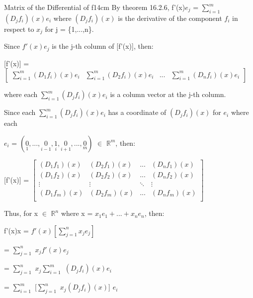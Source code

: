     \begin{definition}{Matrix of the Differential of f}{14cm}
        By {\color{red} theorem 16.2.6},
        f'(x)$e_j$ = $\sum_{i=1}^m$ $(D_jf_i)(x)e_i$
        where $(D_jf_i)(x)$ is the derivative of the
        component $f_i$ in respect to $x_j$ for j = \{1,...,n\}.

        Since $f'(x)e_j$ is the j-th column of [f'(x)], then:

        \vspace{0.1cm}

        \hspace{0.5cm}
        [f'(x)] = 
        $
        \begin{bmatrix}
            \sum_{i=1}^m (D_1f_i)(x)e_i
            & \sum_{i=1}^m (D_2f_i)(x)e_i
            & ...
            & \sum_{i=1}^m (D_nf_i)(x)e_i
        \end{bmatrix}
        $

        where each $\sum_{i=1}^m (D_jf_i)(x)e_i$ is a column vector
        at the j-th column.
        
        Since each $\sum_{i=1}^m (D_jf_i)(x)e_i$ has a coordinate
        of $(D_jf_i)(x)$ for $e_i$ where each
        
        $e_i$ =
        $(\underset{\scriptscriptstyle 1}{0},...,
                    \underset{\scriptscriptstyle i-1}{0},
                    \underset{\scriptscriptstyle i}{1},
                    \underset{\scriptscriptstyle i+1}{0},...,
                    \underset{\scriptscriptstyle m}{0})$
        $\in$ $\mathbb{R}^m$, then:

        \vspace{0.1cm}

        \hspace{0.5cm}
        [f'(x)] =
        $
        \begin{bmatrix}
            (D_1f_1)(x) & (D_2f_1)(x) & ... & (D_nf_1)(x) \\
            (D_1f_2)(x) & (D_2f_2)(x) & ... & (D_nf_2)(x) \\
            \vdots & \vdots & \ddots & \vdots \\
            (D_1f_m)(x) & (D_2f_m)(x) & ... & (D_nf_m)(x) \\
        \end{bmatrix}
        $

        Thus, for x $\in$ $\mathbb{R}^n$ where
        x = $x_1e_1 + ... + x_ne_n$, then:

        \hspace{0.5cm}
        f'(x)x
        = $f'(x)[\sum_{j=1}^n x_j e_j]$

        \hspace{1.7cm}
        = $\sum_{j=1}^n$ $x_j f'(x) e_j$

        \hspace{1.7cm}
        = $\sum_{j=1}^n$ $x_j \sum_{i=1}^m$ $(D_jf_i)(x)e_i$

        \hspace{1.7cm}
        = $\sum_{i=1}^m$ [$\sum_{j=1}^n$ $x_j (D_jf_i)(x)$] $e_i$
    \end{definition}

